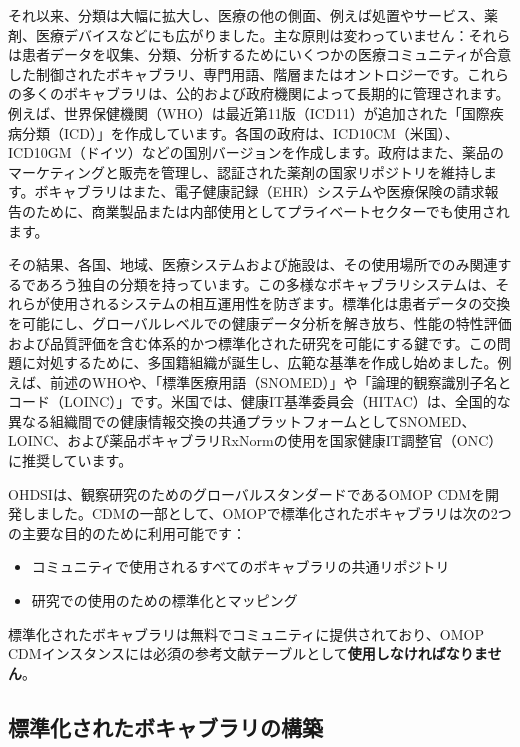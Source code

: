 \documentclass[
  11pt]{book}
\providecommand{\tightlist}{%
  \setlength{\itemsep}{0pt}\setlength{\parskip}{0pt}}
\theoremstyle{definition}
\theoremstyle{definition}
\theoremstyle{definition}
\theoremstyle{definition}
\theoremstyle{remark}
\begin{document}
それ以来、分類は大幅に拡大し、医療の他の側面、例えば処置やサービス、薬剤、医療デバイスなどにも広がりました。主な原則は変わっていません：それらは患者データを収集、分類、分析するためにいくつかの医療コミュニティが合意した制御されたボキャブラリ、専門用語、階層またはオントロジーです。これらの多くのボキャブラリは、公的および政府機関によって長期的に管理されます。例えば、世界保健機関（WHO）は最近第11版（ICD11）が追加された「国際疾病分類（ICD）」を作成しています。各国の政府は、ICD10CM（米国）、ICD10GM（ドイツ）などの国別バージョンを作成します。政府はまた、薬品のマーケティングと販売を管理し、認証された薬剤の国家リポジトリを維持します。ボキャブラリはまた、電子健康記録（EHR）システムや医療保険の請求報告のために、商業製品または内部使用としてプライベートセクターでも使用されます。

その結果、各国、地域、医療システムおよび施設は、その使用場所でのみ関連するであろう独自の分類を持っています。この多様なボキャブラリシステムは、それらが使用されるシステムの相互運用性を防ぎます。標準化は患者データの交換を可能にし、グローバルレベルでの健康データ分析を解き放ち、性能の特性評価および品質評価を含む体系的かつ標準化された研究を可能にする鍵です。この問題に対処するために、多国籍組織が誕生し、広範な基準を作成し始めました。例えば、前述のWHOや、「標準医療用語（SNOMED）」や「論理的観察識別子名とコード（LOINC）」です。米国では、健康IT基準委員会（HITAC）は、全国的な異なる組織間での健康情報交換の共通プラットフォームとしてSNOMED、LOINC、および薬品ボキャブラリRxNormの使用を国家健康IT調整官（ONC）に推奨しています。

OHDSIは、観察研究のためのグローバルスタンダードであるOMOP CDMを開発しました。CDMの一部として、OMOPで標準化されたボキャブラリは次の2つの主要な目的のために利用可能です：

\begin{itemize}
\tightlist
\item
  コミュニティで使用されるすべてのボキャブラリの共通リポジトリ
\item
  研究での使用のための標準化とマッピング
\end{itemize}

標準化されたボキャブラリは無料でコミュニティに提供されており、OMOP CDMインスタンスには必須の参考文献テーブルとして\textbf{使用しなければなりません}。

\subsection{標準化されたボキャブラリの構築}\label{ux6a19ux6e96ux5316ux3055ux308cux305fux30dcux30adux30e3ux30d6ux30e9ux30eaux306eux69cbux7bc9}
\end{document}
